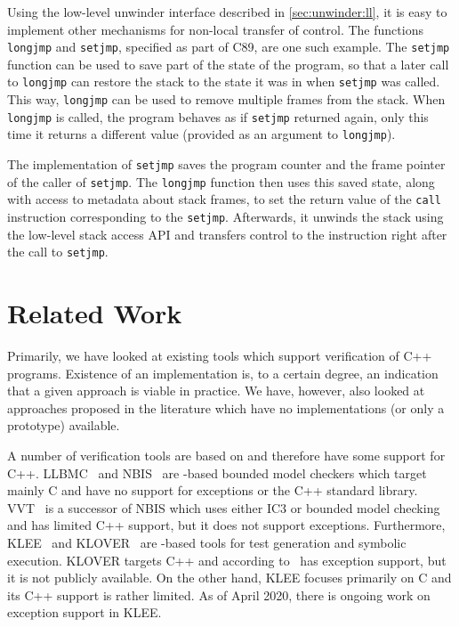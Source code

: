 Using the low-level unwinder interface described in
\autoref{sec:unwinder:ll}, it is easy to implement other mechanisms
for non-local transfer of control. The functions \texttt{longjmp} and
\texttt{setjmp}, specified as part of C89, are one such
example.
The \texttt{setjmp}
function can be used to save part of the state of the program, so that a
later call to \texttt{longjmp} can restore the stack to the state it was
in when \texttt{setjmp} was called. This way, \texttt{longjmp} can be
used to remove multiple frames from the stack. When \texttt{longjmp} is
called, the program behaves as if \texttt{setjmp} returned again, only
this time it returns a different value (provided as an argument to
\texttt{longjmp}).

The \divine{} implementation of \texttt{setjmp} saves the program counter
and the frame pointer of the caller of \texttt{setjmp}.
The \texttt{longjmp} function then uses this saved state, along with access to
metadata about stack frames, to set the return value of the \texttt{call}
instruction corresponding to the \texttt{setjmp}.
Afterwards, it unwinds the stack using the low-level stack access API and
transfers control to the instruction right after the call to \texttt{setjmp}.

\section{Related Work}\label{sec:lang:related}

Primarily, we have looked at existing tools which support verification
of C++ programs. Existence of an implementation is, to a certain degree,
an indication that a given approach is viable in practice. We have,
however, also looked at approaches proposed in the literature which have
no implementations (or only a prototype) available.

A number of verification tools are based on \llvm{} and therefore have some
support for C++. LLBMC~ and
NBIS~ are \llvm{}-based bounded model
checkers which target mainly C and have no support for exceptions or the
C++ standard library. VVT~ is a
successor of NBIS which uses either IC3 or bounded model checking and
has limited C++ support, but it does not support exceptions.
Furthermore, KLEE~ and KLOVER~
are \llvm{}-based tools for test generation and symbolic execution. KLOVER
targets C++ and according to~ has exception support,
but it is not publicly available. On the other hand, KLEE focuses
primarily on C and its C++ support is rather limited.
As of April 2020, there is ongoing work on exception support in KLEE.

